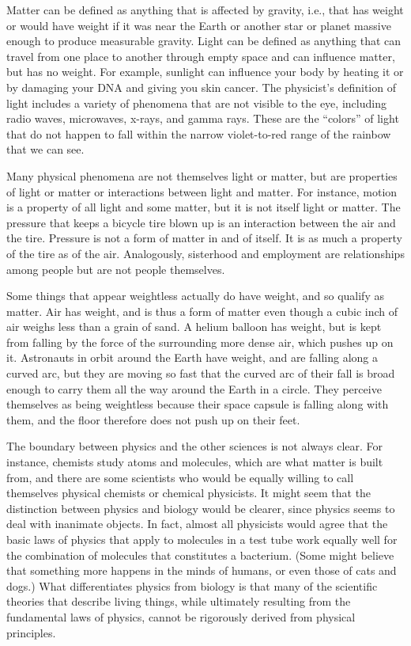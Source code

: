 Matter can be defined as anything that is
affected by gravity, i.e., that has weight or would have
weight if it was near the Earth or another star or planet
massive enough to produce measurable gravity. Light
can be defined as anything that can travel from one place to
another through empty space and can influence matter, but
has no weight. For example, sunlight can influence your body
by heating it or by damaging your DNA and giving you skin
cancer. The physicist's definition of light includes a
variety of phenomena that are not visible to the eye,
including radio waves, microwaves,
x-rays, and gamma rays.
These are the ``colors'' of light that do not happen to fall
within the narrow violet-to-red range of the rainbow that we can see.

Many physical phenomena are not themselves light or matter,
but are properties of light or matter or interactions
between light and matter. For instance, motion is a property
of all light and some matter, but it is not itself light or
matter. The pressure that keeps a bicycle tire blown up is
an interaction between the air and the tire. Pressure is not
a form of matter in and of itself. It is as much a property
of the tire as of the air. Analogously, sisterhood and
employment are relationships among people but are not people themselves.

Some things that appear weightless actually do have weight,
and so qualify as matter. Air has weight, and is thus a form
of matter even though a cubic inch of air weighs less than a
grain of sand. A helium balloon has weight, but is kept from
falling by the force of the surrounding more dense air,
which pushes up on it. Astronauts in orbit around the Earth
have weight, and are falling along a curved arc, but they
are moving so fast that the curved arc of their fall is
broad enough to carry them all the way around the Earth in a
circle. They perceive themselves as being weightless because
their space capsule is falling along with them, and the
floor therefore does not push up on their feet.


The boundary between physics and the other sciences is not
always clear. For instance, chemists study atoms and
molecules, which are what matter is built from, and there
are some scientists who would be equally willing to call
themselves physical chemists or chemical physicists. It
might seem that the distinction between physics and biology
would be clearer, since physics seems to deal with inanimate
objects. In fact, almost all physicists would agree that the
basic laws of physics that apply to molecules in a test tube
work equally well for the combination of molecules that
constitutes a bacterium. (Some might believe that something
more happens in the minds of humans, or even those of cats
and dogs.) What differentiates physics from biology is that
many of the scientific theories that describe living things,
while ultimately resulting from the fundamental laws of
physics, cannot be rigorously derived from physical principles.


